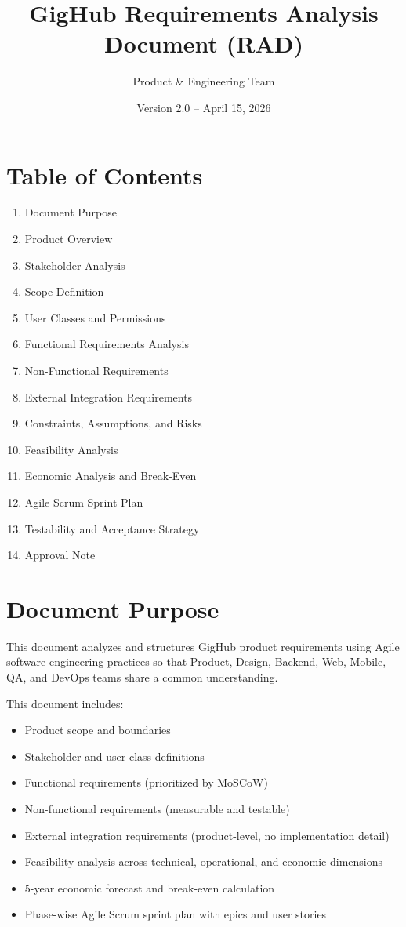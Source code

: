 \documentclass[a4paper,12pt]{article}
\title{\textbf{GigHub Requirements Analysis Document (RAD)}}
\author{Product \& Engineering Team}
\date{Version 2.0 -- April 15, 2026}
\begin{document}
\maketitle

\section*{Table of Contents}
\begin{enumerate}
    \item Document Purpose
    \item Product Overview
    \item Stakeholder Analysis
    \item Scope Definition
    \item User Classes and Permissions
    \item Functional Requirements Analysis
    \item Non-Functional Requirements
    \item External Integration Requirements
    \item Constraints, Assumptions, and Risks
    \item Feasibility Analysis
    \item Economic Analysis and Break-Even
    \item Agile Scrum Sprint Plan
    \item Testability and Acceptance Strategy
    \item Approval Note
\end{enumerate}

\newpage

\section{Document Purpose}

This document analyzes and structures GigHub product requirements using Agile software engineering practices so that Product, Design, Backend, Web, Mobile, QA, and DevOps teams share a common understanding.

This document includes:
\begin{itemize}
    \item Product scope and boundaries
    \item Stakeholder and user class definitions
    \item Functional requirements (prioritized by MoSCoW)
    \item Non-functional requirements (measurable and testable)
    \item External integration requirements (product-level, no implementation detail)
    \item Feasibility analysis across technical, operational, and economic dimensions
    \item 5-year economic forecast and break-even calculation
    \item Phase-wise Agile Scrum sprint plan with epics and user stories
\end{itemize}
\end{document}
